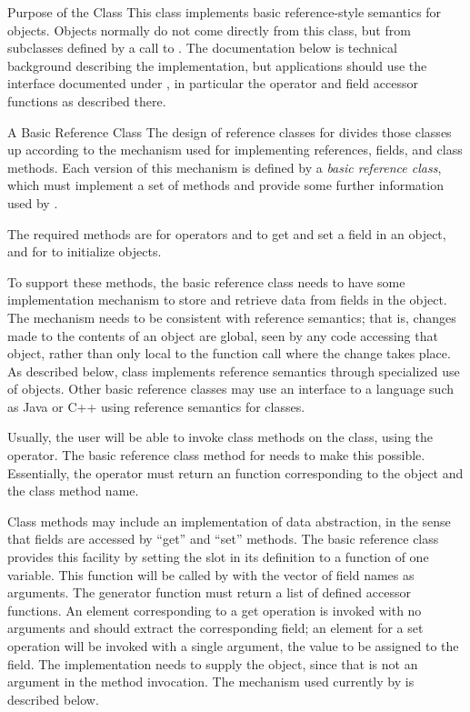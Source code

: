 %
\begin{Section}{Purpose of the Class}
This class implements basic reference-style semantics for \R{}
objects.  Objects normally do not come directly from this class, but
from subclasses defined by a call to .
The documentation below is technical background describing the implementation, but applications
should use the interface documented under ,
in particular the \code{\$} operator and field accessor functions as
described there.
\end{Section}
%
\begin{Section}{A Basic Reference Class}
The design of reference classes for \R{} divides those classes up
according to the mechanism used for implementing references, fields,
and class methods.
Each version of this mechanism is defined by a \emph{basic reference
class}, which must implement a set of methods and provide some
further information used by .

The required methods are for operators \code{\$} and \code{\$<-} to
get and set a field in an object, and for  to
initialize objects.

To support these methods, the basic reference class needs to have some
implementation mechanism to store and retrieve data from fields in the
object.
The mechanism needs to be consistent with reference semantics; that
is, changes made to the contents of an object are global, seen by any
code accessing that object, rather than only local to the function
call where the change takes place.
As described below, class  implements reference
semantics through specialized use of 
objects.
Other basic reference classes may use an interface to a language such
as Java or C++ using reference semantics for classes.

Usually, the \R{}  user will be able to invoke class methods on the
class, using the \code{\$} operator.  The basic reference class
method for \code{\$} needs to make this possible.  Essentially, the
operator must return an \R{} function corresponding to the object and
the class method name.

Class methods may include an implementation of data abstraction, in
the sense that fields are accessed by ``get'' and ``set''
methods.  The basic reference class provides this facility by setting
the  slot in its definition to a
function of one variable.
This function will be called by  with the
vector of field names as arguments.
The generator function must return a list of defined accessor
functions.
An element corresponding to a get operation is invoked with no
arguments and should extract the corresponding field; an element for a
set operation will be invoked with a single argument, the value to be
assigned to the field.
The implementation needs to supply the object, since that is not an
argument in the method invocation.
The mechanism used currently by  is described below.
\end{Section}
